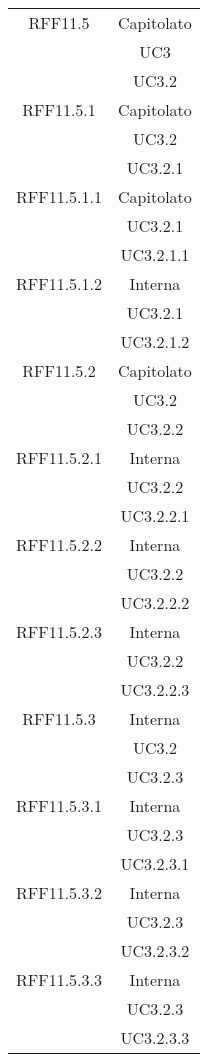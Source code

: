 \begin{longtable}{|c|c|}
\midrule
RFF11.5
& Capitolato\\
& UC3\\
& UC3.2\\

\midrule
RFF11.5.1
& Capitolato\\
& UC3.2\\
& UC3.2.1\\

\midrule
RFF11.5.1.1
& Capitolato\\
& UC3.2.1\\
& UC3.2.1.1\\

\midrule
RFF11.5.1.2
& Interna\\
& UC3.2.1\\
& UC3.2.1.2\\

\midrule
RFF11.5.2
& Capitolato\\
& UC3.2\\
& UC3.2.2\\

\midrule
RFF11.5.2.1
& Interna\\
& UC3.2.2\\
& UC3.2.2.1\\

\midrule
RFF11.5.2.2
& Interna\\
& UC3.2.2\\
& UC3.2.2.2\\

\midrule
RFF11.5.2.3
& Interna\\
& UC3.2.2\\
& UC3.2.2.3\\

\midrule
RFF11.5.3
& Interna\\
& UC3.2\\
& UC3.2.3\\

\midrule
RFF11.5.3.1
& Interna\\
& UC3.2.3\\
& UC3.2.3.1\\

\midrule
RFF11.5.3.2
& Interna\\
& UC3.2.3\\
& UC3.2.3.2\\

\midrule
RFF11.5.3.3
& Interna\\
& UC3.2.3\\
& UC3.2.3.3\\


\end{longtable}
